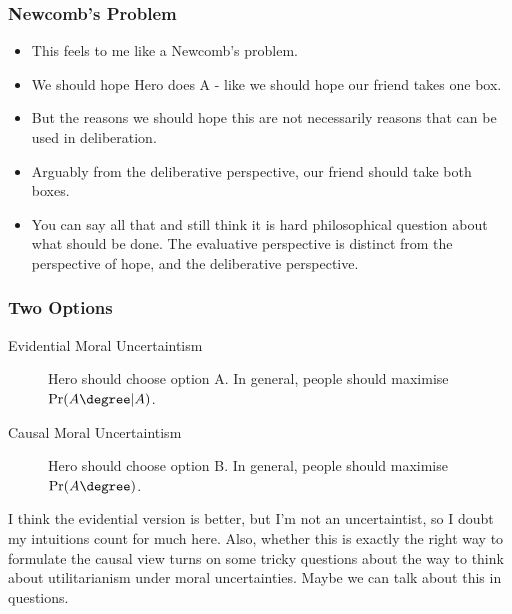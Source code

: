 \begin{frame}[fragile]
\frametitle{Newcomb's Problem}
\label{newcombsproblem}

\begin{itemize}
\item{} This feels to me like a Newcomb's problem.

\item{} We should hope Hero does A - like we should hope our friend takes one box. \pause 

\item{} But the reasons we should hope this are not necessarily reasons that can be used in deliberation.

\item{} Arguably from the deliberative perspective, our friend should take both boxes. \pause 

\item{} You can say all that and still think it is hard philosophical question about what should be done. The evaluative perspective is distinct from the perspective of hope, and the deliberative perspective.

\end{itemize}

\end{frame}

\begin{frame}[fragile]
\frametitle{Two Options}
\label{twooptions}

\begin{description}
\item[Evidential Moral Uncertaintism]

Hero should choose option A. In general, people should maximise $\Pr(A\degree | A)$.

\item[Causal Moral Uncertaintism]

Hero should choose option B. In general, people should maximise $\Pr(A\degree)$. \pause 
\end{description}

I think the evidential version is better, but I'm not an uncertaintist, so I doubt my intuitions count for much here. \pause  Also, whether this is exactly the right way to formulate the causal view turns on some tricky questions about the way to think about utilitarianism under moral uncertainties. Maybe we can talk about this in questions.

\end{frame}


